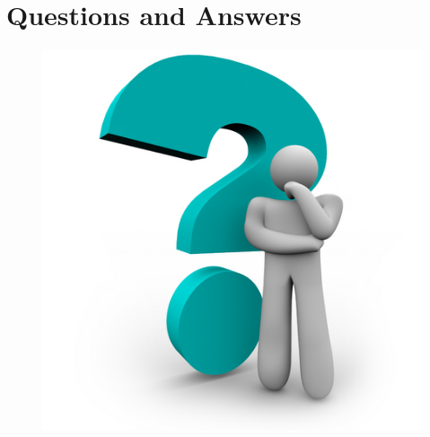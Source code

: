 ﻿\documentclass{beamer}
\begin{document}
\part[Questions and Answers]{Questions and Answers}
\begin{frame}
\begin{figure}
  \centering
  \includegraphics[width=.4\textwidth]{picturedir/QA1.jpg}
\end{figure}
\end{frame}
\end{document}

